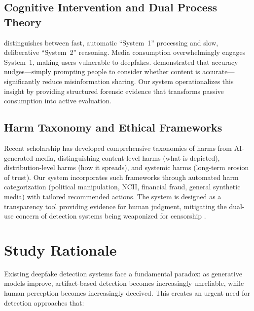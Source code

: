 \documentclass[11pt,a4paper]{article}
\begin{document}
\subsection{Cognitive Intervention and Dual Process Theory}

\citet{kahneman2011thinking} distinguishes between fast, automatic ``System~1'' processing and slow, deliberative ``System~2'' reasoning. Media consumption overwhelmingly engages System~1, making users vulnerable to deepfakes. \citet{pennycook2021shifting} demonstrated that accuracy nudges---simply prompting people to consider whether content is accurate---significantly reduce misinformation sharing. Our system operationalizes this insight by providing structured forensic evidence that transforms passive consumption into active evaluation.

\subsection{Harm Taxonomy and Ethical Frameworks}

Recent scholarship has developed comprehensive taxonomies of harms from AI-generated media, distinguishing content-level harms (what is depicted), distribution-level harms (how it spreads), and systemic harms (long-term erosion of trust). Our system incorporates such frameworks through automated harm categorization (political manipulation, NCII, financial fraud, general synthetic media) with tailored recommended actions. The system is designed as a transparency tool providing evidence for human judgment, mitigating the dual-use concern of detection systems being weaponized for censorship \citep{chesney2019deep}.


\section{Study Rationale}

Existing deepfake detection systems face a fundamental paradox: as generative models improve, artifact-based detection becomes increasingly unreliable, while human perception becomes increasingly deceived. This creates an urgent need for detection approaches that:
\end{document}
